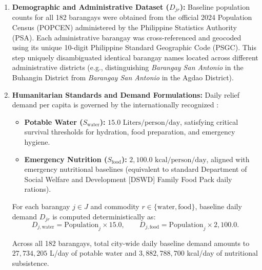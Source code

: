 \begin{enumerate}
    \item \textbf{Demographic and Administrative Dataset ($D_{jr}$):} Baseline population counts for all 182 barangays were obtained from the official 2024 Population Census (POPCEN) administered by the Philippine Statistics Authority (PSA). Each administrative barangay was cross-referenced and geocoded using its unique 10-digit Philippine Standard Geographic Code (PSGC). This step uniquely disambiguated identical barangay names located across different administrative districts (e.g., distinguishing \textit{Barangay San Antonio} in the Buhangin District from \textit{Barangay San Antonio} in the Agdao District).

    \item \textbf{Humanitarian Standards and Demand Formulations:} Daily relief demand per capita is governed by the internationally recognized \citep{sphere2018handbook}:
    \begin{itemize}
        \item \textbf{Potable Water ($S_{\text{water}}$):} $15.0\text{ Liters/person/day}$, satisfying critical survival thresholds for hydration, food preparation, and emergency hygiene.
        \item \textbf{Emergency Nutrition ($S_{\text{food}}$):} $2{,}100.0\text{ kcal/person/day}$, aligned with emergency nutritional baselines (equivalent to standard Department of Social Welfare and Development [DSWD] Family Food Pack daily rations).
    \end{itemize}

    For each barangay $j \in J$ and commodity $r \in \{\text{water},\text{food}\}$, baseline daily demand $D_{jr}$ is computed deterministically as:
    \begin{equation}
        D_{j,\text{water}} = \text{Population}_j \times 15.0,
        \qquad
        D_{j,\text{food}} = \text{Population}_j \times 2{,}100.0.
    \end{equation}

    Across all 182 barangays, total city-wide daily baseline demand amounts to $27{,}734{,}205$ L/day of potable water and $3{,}882{,}788{,}700$ kcal/day of nutritional subsistence.


\end{enumerate}
